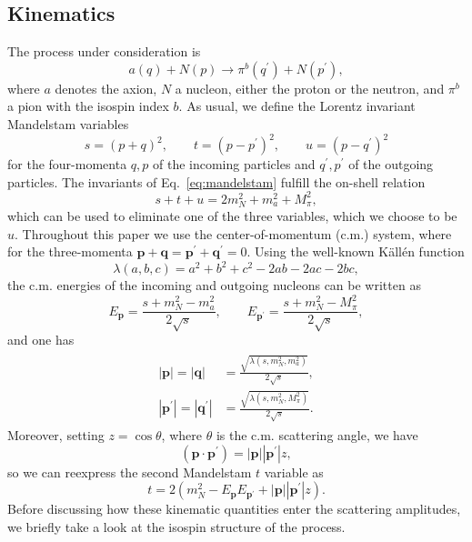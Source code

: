 \documentclass[reprint,amssymb,amsmath,floatfix,aps,prd,groupedaddress,nofootinbib]{revtex4-2}
\newcommand{\sdot}[2]{\left( #1\cdot #2 \right)}
\begin{document}
\subsection{Kinematics}
The process under consideration is
\begin{equation}
a(q) + N(p)  \to \pi^b(q^\prime) + N(p^\prime) ,
\end{equation}
where $a$ denotes the axion, $N$ a nucleon, either the proton or the neutron, and $\pi^b$ a pion with the isospin index $b$.
As usual, we define the Lorentz invariant Mandelstam variables
\begin{equation}\label{eq:mandelstam}
s = (p+q)^2,\qquad t = (p-p^\prime)^2,\qquad u = (p-q^\prime)^2
\end{equation}
for the four-momenta $q,p$ of the incoming particles and $q^\prime,p^\prime$ of the outgoing particles. The
invariants of Eq.~\eqref{eq:mandelstam} fulfill the on-shell relation
\begin{equation}
s+t+u = 2m_N^2 + m_a^2 + M_\pi^2 , \label{eq:MandelstamIdentity}
\end{equation}
which can be used to eliminate one of the three variables, which we choose to be $u$. Throughout this paper
we use the center-of-momentum (c.m.) system, where for the three-momenta $\mathbf{p}+\mathbf{q}=
\mathbf{p^\prime}+\mathbf{q^\prime}=0$. Using the well-known K\"all\'{e}n function
\begin{equation}
\lambda(a,b,c) = a^2+b^2+c^2-2ab-2ac-2bc ,
\end{equation}
the c.m. energies of the incoming and outgoing nucleons can be written as
\begin{equation}
E_\mathbf{p} = \frac{s+m_N^2-m_a^2}{2\sqrt{s}},\qquad E_\mathbf{p^\prime} = \frac{s+m_N^2-M_\pi^2}{2\sqrt{s}},
\end{equation}
and one has
\begin{align}
\begin{split}
|\mathbf{p}|=|\mathbf{q}| & =\frac{\sqrt{\lambda(s,m_N^2,m_a^2)}}{2\sqrt{s}}, \\
 |\mathbf{p^\prime}|=|\mathbf{q^\prime}| & =\frac{\sqrt{\lambda(s,m_N^2,M_\pi^2)}}{2\sqrt{s}} .
\end{split}
\end{align}
Moreover, setting $z=\cos\theta$, where $\theta$ is the c.m. scattering angle, we have
\begin{equation}
\sdot{\mathbf{p}}{\mathbf{p^\prime}}=|\mathbf{p}||\mathbf{p^\prime}| z ,
\end{equation}
so we can reexpress the second Mandelstam $t$ variable as
\begin{equation}
t = 2 \left(m_N^2 - E_\mathbf{p} E_\mathbf{p^\prime} + |\mathbf{p}||\mathbf{p^\prime}| z \right) .
\end{equation}
Before discussing how these kinematic quantities enter the scattering amplitudes, we briefly take a look at
the isospin structure of the process.
\end{document}
